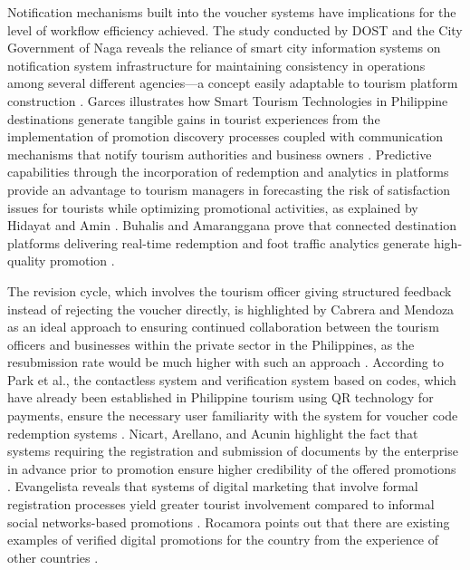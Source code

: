 \documentclass{research}
\begin{document}
Notification mechanisms built into the voucher systems have implications for the level of workflow efficiency achieved. The study conducted by DOST and the City Government of Naga reveals the reliance of smart city information systems on notification system infrastructure for maintaining consistency in operations among several different agencies—a concept easily adaptable to tourism platform construction \cite{dost2024,naga2024}. Garces illustrates how Smart Tourism Technologies in Philippine destinations generate tangible gains in tourist experiences from the implementation of promotion discovery processes coupled with communication mechanisms that notify tourism authorities and business owners \cite{garces2025}. Predictive capabilities through the incorporation of redemption and analytics in platforms provide an advantage to tourism managers in forecasting the risk of satisfaction issues for tourists while optimizing promotional activities, as explained by Hidayat and Amin \cite{hidayat2023}. Buhalis and Amaranggana prove that connected destination platforms delivering real-time redemption and foot traffic analytics generate high-quality promotion \cite{amaranggana2023}.

The revision cycle, which involves the tourism officer giving structured feedback instead of rejecting the voucher directly, is highlighted by Cabrera and Mendoza as an ideal approach to ensuring continued collaboration between the tourism officers and businesses within the private sector in the Philippines, as the resubmission rate would be much higher with such an approach \cite{cabrera2024}. According to Park et al., the contactless system and verification system based on codes, which have already been established in Philippine tourism using QR technology for payments, ensure the necessary user familiarity with the system for voucher code redemption systems \cite{park2022}. Nicart, Arellano, and Acunin highlight the fact that systems requiring the registration and submission of documents by the enterprise in advance prior to promotion ensure higher credibility of the offered promotions \cite{nicart2024}. Evangelista reveals that systems of digital marketing that involve formal registration processes yield greater tourist involvement compared to informal social networks-based promotions \cite{evangelista2022}. Rocamora points out that there are existing examples of verified digital promotions for the country from the experience of other countries \cite{rocamora2022}.
\end{document}
